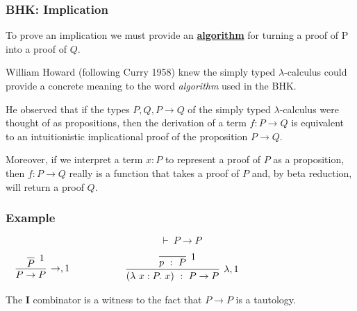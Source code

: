 \documentclass{beamer}
\theoremstyle{indentDefn} \newtheorem{defn}[]{Definition}
\begin{document}
\begin{frame}
  \frametitle{BHK: Implication}

    To prove an implication we must provide an \underline{{\bf algorithm}} for turning a proof of P into a proof of $Q$.

    William Howard (following Curry 1958) knew the simply typed $\lambda$-calculus could provide a concrete meaning to the word \emph{algorithm} used in the BHK. 

    He observed that if the types $P,Q, P\to Q$ of the simply typed $\lambda$-calculus were thought of as propositions, then the derivation of a term $f : P \to Q$ is equivalent to an intuitionistic implicational proof of the proposition $P \to Q$. 
    
    Moreover, if we interpret a term $x : P$ to represent a proof of $P$ as a proposition, then $f : P \to Q$ really is a function that takes a proof of $P$ and, by beta reduction, will return a proof $Q$.
\end{frame}

\begin{frame}
  \frametitle{Example}

  $$\vdash \ P \to P$$

  \vspace{10mm}

  \begin{center}
    $\begin{array}{l c r}
      
      \begin{array}{c}
        \infer[\to, 1]{P \to P}
          {\infer[1]{P}{}}
      \end{array}

      &
      \hspace{10mm}
      &
      
      \begin{array}{c}
        \infer[\lambda, 1]{(\lambda \ x : P. \ x) \ : \ P \to P}
          {\infer[1]{p \ : \ P}{}}
      \end{array}

    \end{array}$
  \end{center}

  \vspace{25mm}
  
  The \textbf{I} combinator is a witness to the fact that $P \to P$ is a tautology.
\end{frame}
\end{document}
